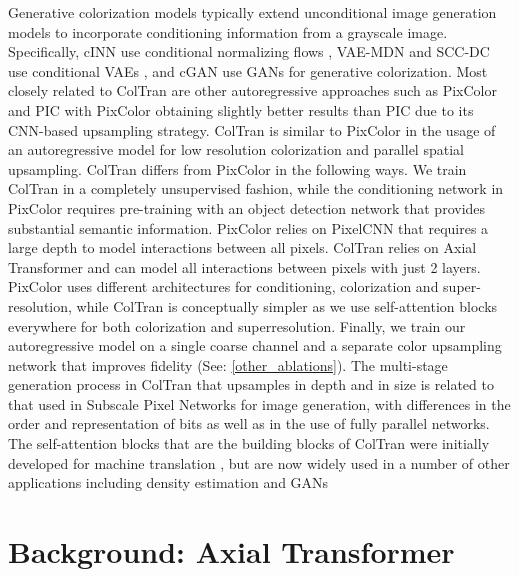 \documentclass{article} \usepackage{iclr2021_conference,times}
\begin{document}
Generative colorization models typically extend unconditional image generation models to incorporate conditioning information from a grayscale image. Specifically, cINN \citep{ardizzone2019guided} use conditional normalizing flows \citep{dinh2014nice}, VAE-MDN \citep{deshpande2017learning, deshpande2015learning} and SCC-DC \citep{Messaoud_2018_ECCV} use conditional VAEs \citep{kingma2013auto}, and cGAN \citep{cao2017unsupervised} use GANs \citep{goodfellow2014generative} for generative colorization. Most closely related to ColTran are other autoregressive approaches such as PixColor \citep{guadarrama2017pixcolor} and PIC \citep{royer2017probabilistic} with PixColor obtaining slightly better results than PIC due to its CNN-based upsampling strategy. ColTran is similar to PixColor in the usage of an autoregressive model for low resolution colorization and parallel spatial upsampling. ColTran differs from PixColor in the following ways. We train ColTran in a completely unsupervised fashion, while the conditioning network in PixColor requires pre-training with an object detection network that provides substantial semantic information. PixColor relies on PixelCNN \citep{oord2016pixel} that requires a large depth to model interactions between all pixels. ColTran relies on Axial Transformer \citep{ho2019axial} and can model all interactions between pixels with just 2 layers. PixColor uses different architectures for conditioning, colorization and super-resolution, while ColTran is conceptually simpler as we use self-attention blocks everywhere for both colorization and superresolution. Finally, we train our autoregressive model on a single coarse channel and a separate color upsampling network that improves fidelity (See: \ref{other_ablations}). The multi-stage generation process in ColTran that upsamples in depth and in size is related to that used in Subscale Pixel Networks \citep{menick2018generating} for image generation, with differences in the order and representation of bits as well as in the use of fully parallel networks.
The self-attention blocks that are the building blocks of ColTran were initially developed for machine translation \citep{vaswani2017attention}, but are now widely used in a number of other applications including density estimation \citep{parmar2018image, child2019generating, ho2019flow++,weissenborn2019scaling} and GANs \citep{zhang2019self}



\section{Background: Axial Transformer}
\end{document}
